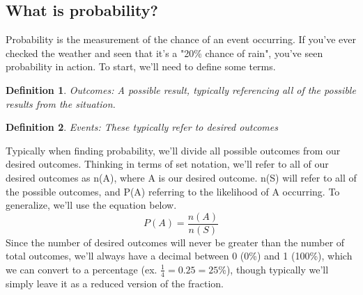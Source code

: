\documentclass[final,1p,12pt]{elsarticle}
\newtheorem{definition}{Definition}
\begin{document}
    \subsection{What is probability?}
    Probability is the measurement of the chance of an event occurring.
    If you've ever checked the weather and seen that it's a "20\% chance of rain", you've seen probability in action.
    To start, we'll need to define some terms.
    \begin{definition}
        Outcomes: A possible result, typically referencing all of the possible results from the situation.
    \end{definition}
    \begin{definition}
        Events: These typically refer to desired outcomes
    \end{definition}
    Typically when finding probability, we'll divide all possible outcomes from our desired outcomes.
    Thinking in terms of set notation, we'll refer to all of our desired outcomes as n(A), where A is our desired outcome.
    n(S) will refer to all of the possible outcomes, and P(A) referring to the likelihood of A occurring.
    To generalize, we'll use the equation below.
    \begin{equation*}
        P(A) = \frac{n(A)}{n(S)}
    \end{equation*}
    Since the number of desired outcomes will never be greater than the number of total outcomes, we'll always have a decimal between 0 (0\%) and 1 (100\%), which we can convert to a percentage (ex. $\frac{1}{4}=0.25=25\%$), though typically we'll simply leave it as a reduced version of the fraction.
    
\end{document}
